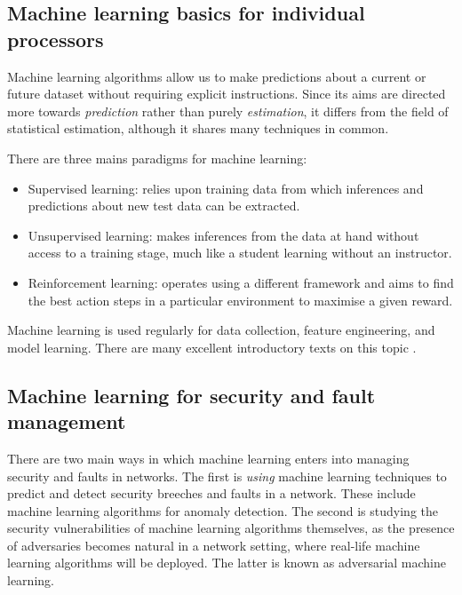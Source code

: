 \documentclass[twocolumn, aps, rmp, amsmath, amssymb, nofootinbib, superscriptaddress, longbibliography, floatfix, table-of-contents, eqsecnum]{revtex4}
\begin{document}
\subsection{Machine learning basics for individual processors}

Machine learning algorithms allow us to make predictions about a current or future dataset without requiring explicit instructions. Since its aims are directed more towards \textit{prediction} rather than purely \textit{estimation}, it differs from the field of statistical estimation, although it shares many techniques in common.

There are three mains paradigms for machine learning:
\begin{itemize}
	\item Supervised learning: relies upon training data from which inferences and predictions about new test data can be extracted.
	\item Unsupervised learning: makes inferences from the data at hand without access to a training stage, much like a student learning without an instructor.
	\item Reinforcement learning:	operates using a different framework and aims to find the best action steps in a particular environment to maximise a given reward.
\end{itemize}

Machine learning is used regularly for data collection, feature engineering, and model learning. There are many excellent introductory texts on this topic \cite{bishop2006pattern, shalev2014understanding, trevor2009elements, marsland2011machine, flach2012machine}.


\subsection{Machine learning for security and fault management}

There are two main ways in which machine learning enters into managing security and faults in networks. The first is \textit{using} machine learning techniques to predict and detect security breeches and faults in a network. These include machine learning algorithms for anomaly detection. The second is studying the security vulnerabilities of machine learning algorithms themselves, as the presence of adversaries becomes natural in a network setting, where real-life machine learning algorithms will be deployed. The latter is known as adversarial machine learning.
\end{document}

